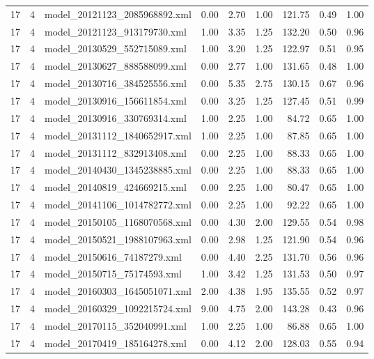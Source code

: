 \begin{table}[ht]
\begin{tabular}{rrlrrrrrr}
   17 &   4 & model\_20121123\_2085968892.xml & 0.00 & 2.70 & 1.00 & 121.75 & 0.49 & 1.00 \\ 
   17 &   4 & model\_20121123\_913179730.xml & 1.00 & 3.35 & 1.25 & 132.20 & 0.50 & 0.96 \\ 
   17 &   4 & model\_20130529\_552715089.xml & 1.00 & 3.20 & 1.25 & 122.97 & 0.51 & 0.95 \\ 
   17 &   4 & model\_20130627\_888588099.xml & 0.00 & 2.77 & 1.00 & 131.65 & 0.48 & 1.00 \\ 
   17 &   4 & model\_20130716\_384525556.xml & 0.00 & 5.35 & 2.75 & 130.15 & 0.67 & 0.96 \\ 
   17 &   4 & model\_20130916\_156611854.xml & 0.00 & 3.25 & 1.25 & 127.45 & 0.51 & 0.99 \\ 
   17 &   4 & model\_20130916\_330769314.xml & 1.00 & 2.25 & 1.00 & 84.72 & 0.65 & 1.00 \\ 
   17 &   4 & model\_20131112\_1840652917.xml & 1.00 & 2.25 & 1.00 & 87.85 & 0.65 & 1.00 \\ 
   17 &   4 & model\_20131112\_832913408.xml & 0.00 & 2.25 & 1.00 & 88.33 & 0.65 & 1.00 \\ 
   17 &   4 & model\_20140430\_1345238885.xml & 0.00 & 2.25 & 1.00 & 88.33 & 0.65 & 1.00 \\ 
   17 &   4 & model\_20140819\_424669215.xml & 0.00 & 2.25 & 1.00 & 80.47 & 0.65 & 1.00 \\ 
   17 &   4 & model\_20141106\_1014782772.xml & 0.00 & 2.25 & 1.00 & 92.22 & 0.65 & 1.00 \\ 
   17 &   4 & model\_20150105\_1168070568.xml & 0.00 & 4.30 & 2.00 & 129.55 & 0.54 & 0.98 \\ 
   17 &   4 & model\_20150521\_1988107963.xml & 0.00 & 2.98 & 1.25 & 121.90 & 0.54 & 0.96 \\ 
   17 &   4 & model\_20150616\_74187279.xml & 0.00 & 4.40 & 2.25 & 131.70 & 0.56 & 0.96 \\ 
   17 &   4 & model\_20150715\_75174593.xml & 1.00 & 3.42 & 1.25 & 131.53 & 0.50 & 0.97 \\ 
   17 &   4 & model\_20160303\_1645051071.xml & 2.00 & 4.38 & 1.95 & 135.55 & 0.52 & 0.97 \\ 
   17 &   4 & model\_20160329\_1092215724.xml & 9.00 & 4.75 & 2.00 & 143.28 & 0.43 & 0.96 \\ 
   17 &   4 & model\_20170115\_352040991.xml & 1.00 & 2.25 & 1.00 & 86.88 & 0.65 & 1.00 \\ 
   17 &   4 & model\_20170419\_185164278.xml & 0.00 & 4.12 & 2.00 & 128.03 & 0.55 & 0.94 \\ 

\end{tabular}
\end{table}
